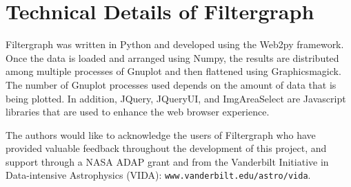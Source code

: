 \section{Technical Details of Filtergraph}
Filtergraph was written in Python and developed using the Web2py framework. Once the data is loaded and arranged using Numpy, the results are distributed among multiple processes of Gnuplot and then flattened using Graphicsmagick. The number of Gnuplot processes used depends on the amount of data that is being plotted. In addition, JQuery, JQueryUI, and ImgAreaSelect are Javascript libraries that are used to enhance the web browser experience. 

\acknowledgements 
The authors would like to acknowledge the users of Filtergraph who have provided valuable feedback throughout the development of this project, and support  through a NASA ADAP grant and from the Vanderbilt Initiative in Data-intensive Astrophysics (VIDA): {\tt www.vanderbilt.edu/astro/vida}. 
